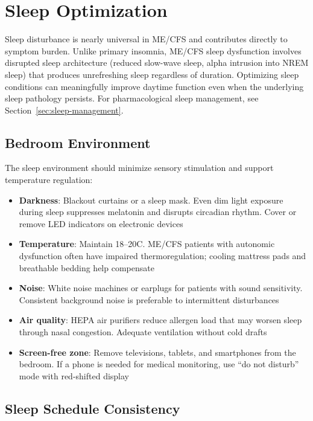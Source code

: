\section{Sleep Optimization}
\label{sec:sleep-optimization}

Sleep disturbance is nearly universal in ME/CFS and contributes directly to symptom burden. Unlike primary insomnia, ME/CFS sleep dysfunction involves disrupted sleep architecture (reduced slow-wave sleep, alpha intrusion into NREM sleep) that produces unrefreshing sleep regardless of duration. Optimizing sleep conditions can meaningfully improve daytime function even when the underlying sleep pathology persists. For pharmacological sleep management, see Section~\ref{sec:sleep-management}.

\subsection{Bedroom Environment}

The sleep environment should minimize sensory stimulation and support temperature regulation:

\begin{itemize}
    \item \textbf{Darkness}: Blackout curtains or a sleep mask. Even dim light exposure during sleep suppresses melatonin and disrupts circadian rhythm. Cover or remove LED indicators on electronic devices
    \item \textbf{Temperature}: Maintain 18--20\textdegree C. ME/CFS patients with autonomic dysfunction often have impaired thermoregulation; cooling mattress pads and breathable bedding help compensate
    \item \textbf{Noise}: White noise machines or earplugs for patients with sound sensitivity. Consistent background noise is preferable to intermittent disturbances
    \item \textbf{Air quality}: HEPA air purifiers reduce allergen load that may worsen sleep through nasal congestion. Adequate ventilation without cold drafts
    \item \textbf{Screen-free zone}: Remove televisions, tablets, and smartphones from the bedroom. If a phone is needed for medical monitoring, use ``do not disturb'' mode with red-shifted display
\end{itemize}

\subsection{Sleep Schedule Consistency}

